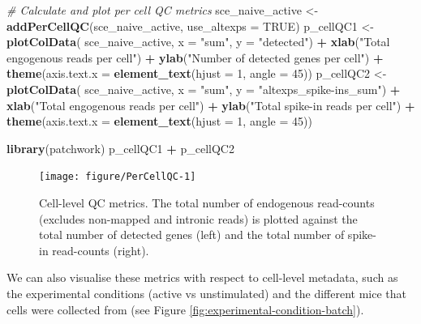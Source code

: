 \documentclass[9pt,a4paper,]{extarticle}
\newenvironment{Shaded}{\begin{snugshade}}{\end{snugshade}}
\newcommand{\CommentTok}[1]{\textcolor[rgb]{0.56,0.35,0.01}{\textit{#1}}}
\newcommand{\DataTypeTok}[1]{\textcolor[rgb]{0.13,0.29,0.53}{#1}}
\newcommand{\DecValTok}[1]{\textcolor[rgb]{0.00,0.00,0.81}{#1}}
\newcommand{\KeywordTok}[1]{\textcolor[rgb]{0.13,0.29,0.53}{\textbf{#1}}}
\newcommand{\NormalTok}[1]{#1}
\newcommand{\OperatorTok}[1]{\textcolor[rgb]{0.81,0.36,0.00}{\textbf{#1}}}
\newcommand{\OtherTok}[1]{\textcolor[rgb]{0.56,0.35,0.01}{#1}}
\newcommand{\StringTok}[1]{\textcolor[rgb]{0.31,0.60,0.02}{#1}}
\begin{document}
\begin{Shaded}
\begin{Highlighting}[]
\CommentTok{# Calculate and plot per cell QC metrics}
\NormalTok{sce_naive_active <-}\StringTok{ }\KeywordTok{addPerCellQC}\NormalTok{(sce_naive_active, }\DataTypeTok{use_altexps =} \OtherTok{TRUE}\NormalTok{)}
\NormalTok{p_cellQC1 <-}\StringTok{ }\KeywordTok{plotColData}\NormalTok{(}
\NormalTok{  sce_naive_active, }
  \DataTypeTok{x =} \StringTok{"sum"}\NormalTok{, }
  \DataTypeTok{y =} \StringTok{"detected"}\NormalTok{) }\OperatorTok{+}
\StringTok{  }\KeywordTok{xlab}\NormalTok{(}\StringTok{"Total engogenous reads per cell"}\NormalTok{) }\OperatorTok{+}
\StringTok{  }\KeywordTok{ylab}\NormalTok{(}\StringTok{"Number of detected genes per cell"}\NormalTok{) }\OperatorTok{+}
\StringTok{  }\KeywordTok{theme}\NormalTok{(}\DataTypeTok{axis.text.x =} \KeywordTok{element_text}\NormalTok{(}\DataTypeTok{hjust =} \DecValTok{1}\NormalTok{, }\DataTypeTok{angle =} \DecValTok{45}\NormalTok{))}
\NormalTok{p_cellQC2 <-}\StringTok{ }\KeywordTok{plotColData}\NormalTok{(}
\NormalTok{  sce_naive_active, }
  \DataTypeTok{x =} \StringTok{"sum"}\NormalTok{, }
  \DataTypeTok{y =} \StringTok{"altexps_spike-ins_sum"}\NormalTok{) }\OperatorTok{+}
\StringTok{  }\KeywordTok{xlab}\NormalTok{(}\StringTok{"Total engogenous reads per cell"}\NormalTok{) }\OperatorTok{+}
\StringTok{  }\KeywordTok{ylab}\NormalTok{(}\StringTok{"Total spike-in reads per cell"}\NormalTok{) }\OperatorTok{+}
\StringTok{  }\KeywordTok{theme}\NormalTok{(}\DataTypeTok{axis.text.x =} \KeywordTok{element_text}\NormalTok{(}\DataTypeTok{hjust =} \DecValTok{1}\NormalTok{, }\DataTypeTok{angle =} \DecValTok{45}\NormalTok{))}

\KeywordTok{library}\NormalTok{(patchwork)}
\NormalTok{p_cellQC1 }\OperatorTok{+}\StringTok{ }\NormalTok{p_cellQC2}
\end{Highlighting}
\end{Shaded}

\begin{figure}

{\centering \texttt{[image: figure/PerCellQC-1]} 

}

\caption{Cell-level QC metrics. The total number of endogenous read-counts (excludes non-mapped and intronic reads) is plotted against the total number of detected genes (left) and the total number of spike-in read-counts (right).}\label{fig:PerCellQC}
\end{figure}

We can also visualise these metrics with respect to cell-level metadata, such
as the experimental conditions (active vs unstimulated) and the different mice
that cells were collected from
(see Figure \ref{fig:experimental-condition-batch}).
\end{document}
